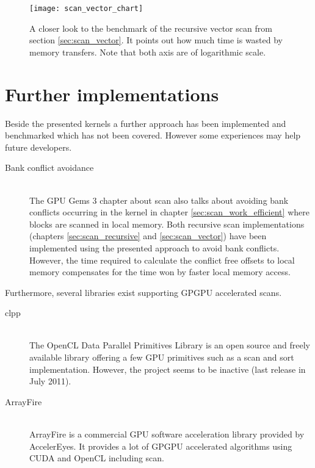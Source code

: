 \begin{figure}[h]
\centering
\texttt{[image: scan\_vector\_chart]}
\caption{A closer look to the benchmark of the recursive vector scan from section \ref{sec:scan_vector}. It points out how much time is wasted by memory transfers.
Note that both axis are of logarithmic scale. }
\label{fig:scan_mem_transfer_chart}
\end{figure}

\section{Further implementations}
Beside the presented kernels a further approach has been implemented and benchmarked which has not been covered. However some experiences may help future developers.

\begin{description}
	\item[Bank conflict avoidance] \hfill \\
	The GPU Gems 3 chapter about scan \cite{gpu_gems_3_chapter_39} also talks about avoiding bank conflicts occurring in the kernel in chapter \ref{sec:scan_work_efficient} where blocks are scanned in local memory. Both recursive scan implementations (chapters \ref{sec:scan_recursive} and \ref{sec:scan_vector}) have been implemented using the presented approach to avoid bank conflicts. However, the time required to calculate the conflict free offsets to local memory compensates for the time won by faster local memory access.
\end{description}

Furthermore, several libraries exist supporting GPGPU accelerated scans.

\begin{description}
   \item[clpp \cite{clpp}] \hfill \\
   The OpenCL Data Parallel Primitives Library is an open source and freely available library offering a few GPU primitives such as a scan and sort implementation. However, the project seems to be inactive (last release in July 2011).
   \item[ArrayFire \cite{arrayfire}] \hfill \\
   ArrayFire is a commercial GPU software acceleration library provided by AccelerEyes. It provides a lot of GPGPU accelerated algorithms using CUDA and OpenCL including scan.
\end{description}

